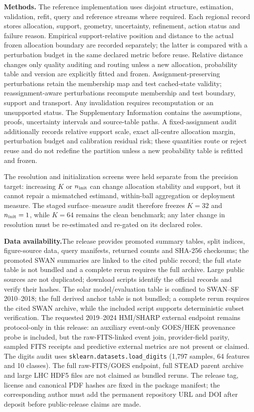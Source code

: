 \documentclass[10pt]{article}
\begin{document}
\textbf{Methods.} The reference implementation uses disjoint structure, estimation, validation, refit, query and reference streams where required. Each regional record stores allocation, support, geometry, uncertainty, refinement, action status and failure reason. Empirical support-relative position and distance to the actual frozen allocation boundary are recorded separately; the latter is compared with a perturbation budget in the same declared metric before reuse. Relative distance changes only quality auditing and routing unless a new allocation, probability table and version are explicitly fitted and frozen. Assignment-preserving perturbations retain the membership map and test cached-state validity; reassignment-aware perturbations recompute membership and test boundary, support and transport. Any invalidation requires recomputation or an unsupported status. The Supplementary Information contains the assumptions, proofs, uncertainty intervals and source-table paths. A fixed-assignment audit additionally records relative support scale, exact all-centre allocation margin, perturbation budget and calibration residual risk; these quantities route or reject reuse and do not redefine the partition unless a new probability table is refitted and frozen.

The resolution and initialization screens were held separate from the precision target: increasing $K$ or $n_{\rm init}$ can change allocation stability and support, but it cannot repair a mismatched estimand, within-ball aggregation or deployment measure. The staged surface--measure audit therefore freezes $K=32$ and $n_{\rm init}=1$, while $K=64$ remains the clean benchmark; any later change in resolution must be re-estimated and re-gated on its declared roles.

\textbf{Data availability.}\;The release provides promoted summary tables, split indices, figure-source data, query manifests, returned counts and SHA-256 checksums; the promoted SWAN summaries are linked to the cited public record; the full state table is not bundled and a complete rerun requires the full archive. Large public sources are not duplicated; download scripts identify the official records and verify their hashes. The solar model/evaluation table is confined to SWAN--SF 2010--2018; the full derived anchor table is not bundled; a complete rerun requires the cited SWAN archive, while the included script supports deterministic subset verification. The requested 2019--2024 HMI/SHARP external endpoint remains protocol-only in this release: an auxiliary event-only GOES/HEK provenance probe is included, but the raw-FITS-linked event join, provider-field parity, sampled FITS receipts and predictive external metrics are not present or claimed. The digits audit uses \texttt{sklearn.datasets.load\_digits} (1,797 samples, 64 features and 10 classes). The full raw-FITS/GOES endpoint, full STEAD parent archive and large LHC HDF5 files are not claimed as bundled reruns. The release tag, license and canonical PDF hashes are fixed in the package manifest; the corresponding author must add the permanent repository URL and DOI after deposit before public-release claims are made.
\end{document}
